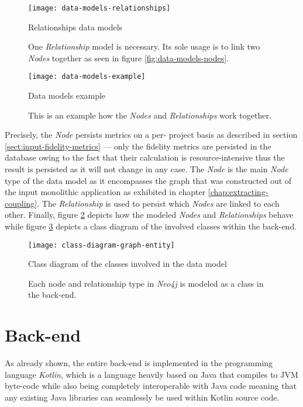 \documentclass[12pt,a4paper]{report}
\begin{document}
\begin{figure}[htbp]
\centering
\texttt{[image: data-models-relationships]}
\caption{Relationships data models}
\caption*{\centering
  One \textit{Relationship} model is necessary. Its sole usage is to link
  two  \textit{Nodes} together as seen in figure \ref{fig:data-models-nodes}.
}
\label{fig:data-models-relationships}
\end{figure}

\begin{figure}[htbp]
\centering
\texttt{[image: data-models-example]}
\caption{Data models example}
\caption*{\centering
  This is an example how the \textit{Nodes} and \textit{Relationships} work together.
}
\label{fig:data-models-example}
\end{figure}

Precisely, the  \textit{Node} persists metrics on a per\hyp
project basis as described in section \ref{sect:input-fidelity-metrics} ---
only the fidelity metrics are persisted in the database owing to the fact that
their calculation is resource\hyp intensive thus the result is persisted as it
will not change in any case. The  \textit{Node} is the main \textit{
Node} type of the data model as it encompasses the graph that was constructed
out of the input monolithic application as exhibited in chapter
\ref{chap:extracting-coupling}. The  \textit{Relationship}
is used to persist which  \textit{Nodes} are linked to each other.
Finally, figure \ref{fig:data-models-example} depicts how the modeled \textit{Nodes}
and \textit{Relationships} behave while figure \ref{fig:class-diagram-graph-entity}
depicts a class diagram of the involved classes within the back-end.

\begin{figure}[htbp]
\centering
\texttt{[image: class-diagram-graph-entity]}
\caption{Class diagram of the classes involved in the data model}
\caption*{\centering
  Each node and relationship type in \textit{Neo4j} is modeled as a class
  in the back-end.
}
\label{fig:class-diagram-graph-entity}
\end{figure}

\section{Back-end} \label{sect:implementation-back-end}

As already shown, the entire back-end is implemented in the programming
language \textit{Kotlin}, which is a language heavily based on Java that
compiles to JVM byte-code while also being completely interoperable with Java
code meaning that any existing Java libraries can seamlessly be used within
Kotlin source code.
\end{document}
